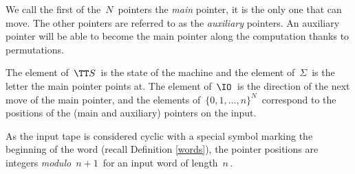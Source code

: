 We call the first of the $\,N\,$ pointers the \emph{main} pointer, it is the only one that can move.
The other pointers are referred to as the \emph{auxiliary} pointers.
An auxiliary pointer will be able to become the main pointer along the computation thanks to permutations.

\vspace{-5mm}
The element of $\,\TT S\,$ is the state of the machine and the element of $\,\Sigma\,$ is the letter the main pointer points at.
The element of $\,\IO\,$ is the direction of the next move of the main pointer, and the elements of $\,\{0,1,\dots,n\}^N\,$ correspond to the positions of the (main and auxiliary)  pointers on the input.

\smallskip

As the input tape is considered cyclic with a special symbol marking the beginning of the word (recall Definition \ref{words}), the pointer positions are integers \emph{modulo} $\,n+1\,$ for an input word of length $\,n\,$.

